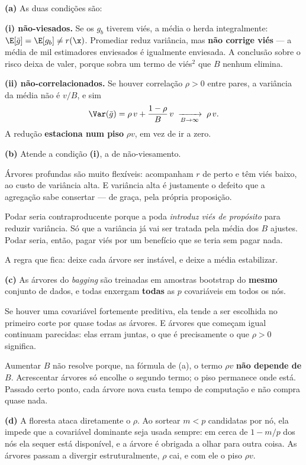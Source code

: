 \begin{solucao}
\textbf{(a)} As duas condições são:

\textbf{(i) não-viesados.} Se os $g_b$ tiverem viés, a média o herda
integralmente: $\E[\bar g]=\E[g_b]\ne r(\x)$. Promediar reduz variância, mas
\textbf{não corrige viés} --- a média de mil estimadores enviesados é igualmente
enviesada. A conclusão sobre o risco deixa de valer, porque sobra um termo de
viés$^2$ que $B$ nenhum elimina.

\textbf{(ii) não-correlacionados.} Se houver correlação $\rho>0$ entre pares, a
variância da média não é $v/B$, e sim
\[
  \Var(\bar g)=\rho\,v+\frac{1-\rho}{B}\,v \;\xrightarrow[B\to\infty]{}\; \rho\,v .
\]
A redução \textbf{estaciona num piso} $\rho v$, em vez de ir a zero.

\smallskip
\textbf{(b)} Atende a condição \textbf{(i)}, a de não-viesamento.

Árvores profundas são muito flexíveis: acompanham $r$ de perto e têm viés baixo,
ao custo de variância alta. E variância alta é justamente o defeito que a
agregação sabe consertar --- de graça, pela própria proposição.

Podar seria contraproducente porque a poda \emph{introduz viés de propósito} para
reduzir variância. Só que a variância já vai ser tratada pela média dos $B$
ajustes. Podar seria, então, pagar viés por um benefício que se teria sem pagar
nada.

A regra que fica: deixe cada árvore ser instável, e deixe a média estabilizar.

\smallskip
\textbf{(c)} As árvores do \emph{bagging} são treinadas em amostras bootstrap do
\textbf{mesmo} conjunto de dados, e todas enxergam \textbf{todas} as $p$
covariáveis em todos os nós.

Se houver uma covariável fortemente preditiva, ela tende a ser escolhida no
primeiro corte por quase todas as árvores. E árvores que começam igual continuam
parecidas: elas erram juntas, o que é precisamente o que $\rho>0$ significa.

Aumentar $B$ não resolve porque, na fórmula de (a), o termo $\rho v$ \textbf{não
depende de $B$}. Acrescentar árvores só encolhe o segundo termo; o piso permanece
onde está. Passado certo ponto, cada árvore nova custa tempo de computação e não
compra quase nada.

\smallskip
\textbf{(d)} A floresta ataca diretamente o $\rho$. Ao sortear $m<p$ candidatas
por nó, ela impede que a covariável dominante seja usada sempre: em cerca de
$1-m/p$ dos nós ela sequer está disponível, e a árvore é obrigada a olhar para
outra coisa. As árvores passam a divergir estruturalmente, $\rho$ cai, e com ele o
piso $\rho v$.


\end{solucao}
